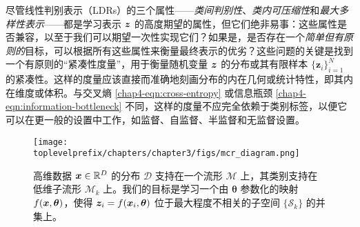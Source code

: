 \documentclass[../../book-main.tex]{subfiles}
\begin{document}
尽管线性判别表示（LDRs）的三个属性——{\em 类间判别性}、{\em 类内可压缩性}和{\em 最大多样性表示}——都是学习表示 $\bm{z}$ 的高度期望的属性，但它们绝非易事：这些属性是否兼容，以至于我们可以期望一次性实现它们？如果是，是否存在一个{\em 简单但有原则的}目标，可以根据所有这些属性来衡量最终表示的优劣？这些问题的关键是{找到}一个有原则的“紧凑性度量”，用于衡量随机变量 $\bm{z}$ 的分布或其有限样本 $\{\bm z_i\}_{i=1}^N$ 的紧凑性。这样的度量应该直接而准确地刻画分布的内在几何或统计特性，即其内在维度或{体积}。与交叉熵 \eqref{chap4-eqn:cross-entropy} 或信息瓶颈 \eqref{chap4-eqn:information-bottleneck} 不同，这样的度量不应完全依赖于类别标签，以便它可以在更一般的设置中工作，如监督、自监督、半监督和无监督设置。

\begin{figure}
	\centering
	\texttt{[image: \\toplevelprefix/chapters/chapter3/figs/mcr\_diagram.png]}
	\caption{高维数据 $\bm{x}\in \mathbb{R}^D$ 的分布 $\mathcal D$ 支持在一个流形 $\mathcal{M}$ 上，其类别支持在低维子流形 $\mathcal{M}_k$ 上。我们的目标是学习一个由 $\bm \theta$ 参数化的映射 $f(\bm{x}, \bm  \theta)$，使得 $\bm{z}_i = f(\bm{x}_i, \bm \theta)$ 位于最大程度不相关的子空间 $\{\mathcal{S}_k\}$ 的并集上。}
	\label{chap4-fig:mcr-diagram}
\end{figure}
\end{document}
